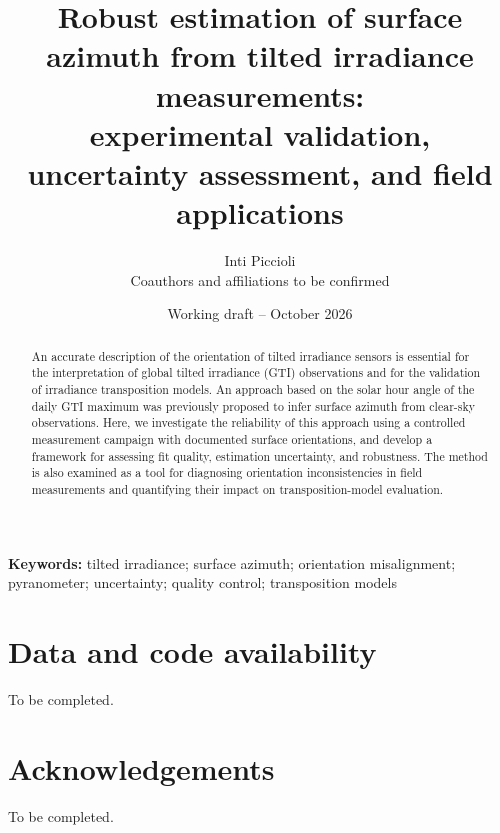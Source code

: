 \documentclass[11pt,a4paper]{article}
\title{Robust estimation of surface azimuth from tilted irradiance measurements:\\
experimental validation, uncertainty assessment, and field applications}
\author{Inti Piccioli\\[1mm]\small Coauthors and affiliations to be confirmed}
\date{Working draft -- October 2026}
\newif\ifdraft
\newcommand{\draftnote}[1]{%
  \ifdraft\par\smallskip\noindent{\color{red!65!black}\sffamily\footnotesize[TO DO: #1]}\par\smallskip\fi
}
\begin{document}
\maketitle

\begin{abstract}
An accurate description of the orientation of tilted irradiance sensors is essential
for the interpretation of global tilted irradiance (GTI) observations and for the
validation of irradiance transposition models. An approach based on the solar
hour angle of the daily GTI maximum was previously proposed to infer surface
azimuth from clear-sky observations. Here, we investigate the reliability of this
approach using a controlled measurement campaign with documented surface
orientations, and develop a framework for assessing fit quality, estimation
uncertainty, and robustness. The method is also examined as a tool for diagnosing
orientation inconsistencies in field measurements and quantifying their impact
on transposition-model evaluation.
\draftnote{Rewrite abstract when final numerical results exist: include sample size, azimuth range, main accuracy and uncertainty metrics, operational benefit, and limitations. Do not imply that field misalignments are independently verified unless they are.}
\end{abstract}

\noindent\textbf{Keywords:} tilted irradiance; surface azimuth; orientation
misalignment; pyranometer; uncertainty; quality control; transposition models








\section*{Data and code availability}
\draftnote{Specify public repository/version, persistent identifier if available, access to quality-controlled data, and limitations on redistributing third-party datasets.}
To be completed.

\section*{Acknowledgements}
\draftnote{Funding, institutions, measurement technicians, collaborators, and computational infrastructure.}
To be completed.




\ifdraft
\clearpage
\appendix

\fi
\end{document}
